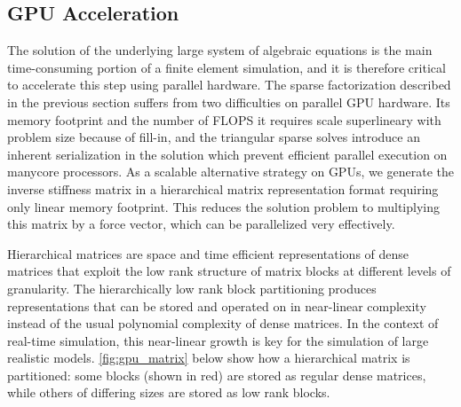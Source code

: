 %




 
\subsection{GPU Acceleration}\label{ssec:gpu_acceleration}

The solution of the underlying large system of algebraic equations is the main time-consuming portion of a finite element simulation, and it is therefore critical to accelerate this step using  parallel hardware. The sparse factorization described in the previous section suffers from two difficulties on parallel GPU hardware. Its memory footprint and the number of FLOPS it requires scale superlineary with problem size because of fill-in, and the triangular sparse solves introduce an inherent serialization in the solution which prevent efficient parallel execution on manycore processors. As a scalable alternative strategy on GPUs, we generate the inverse stiffness matrix in a hierarchical matrix representation format requiring only linear memory footprint.  This reduces the solution problem to multiplying this matrix by a force vector, which can be parallelized very effectively. 

Hierarchical matrices are space and time efficient representations of dense matrices that exploit the low rank structure of matrix blocks at different levels of granularity. The hierarchically low rank block partitioning produces representations that can be stored and operated on in near-linear complexity instead of the usual polynomial complexity of dense matrices. In the context of real-time simulation, this near-linear growth is key for the simulation of large realistic models. \autoref{fig:gpu_matrix} below show how a hierarchical matrix is partitioned: some blocks (shown in red) are stored as regular dense matrices, while others of differing sizes are stored as low rank blocks.


